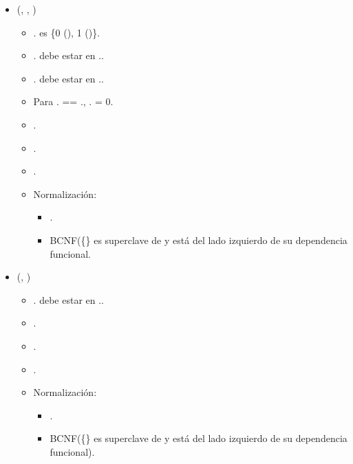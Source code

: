 \begin{itemize}
    \item {}(, , 
        )
            \begin{itemize}
                \item {}. es \{0 
                        (), 1 ()\}.
                \item {}. debe estar en 
                    ..
                \item {}. debe estar en 
                    ..
                \item Para . == 
                    ., 
                    . = 0.
                \item {}.
                \item {}.
                \item {}.
                \item Normalización:
                    \begin{itemize}
                        \item {}.
                        \item BCNF(\{\} es superclave de 
                             y está del lado izquierdo de su 
                            dependencia funcional.
                    \end{itemize}
            \end{itemize}
            
        \item {}(, )
            \begin{itemize}
                \item {}. debe estar en 
                    ..
                \item {}.
                \item {}.
                \item \FK{$\emptyset$}.
                \item Normalización:
                    \begin{itemize}
                        \item {}.
                        \item BCNF(\{\} es superclave de 
                             y está del lado izquierdo de su 
                            dependencia funcional).
                    \end{itemize}
            \end{itemize}


\end{itemize}
